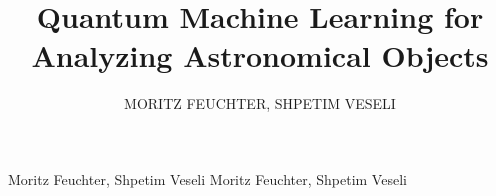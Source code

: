 
\title{Quantum Machine Learning for Analyzing Astronomical Objects}
\author{\uppercase{Moritz Feuchter}, \uppercase{Shpetim Veseli}}
\address[1]{Zurich University of Applied Sciences, School of Engineering (e-mail: feuchmor@students.zhaw.ch)}
\address[2]{Zurich University of Applied Sciences, School of Engineering (e-mail: veselshp@students.zhaw.ch)}

\markboth
{Moritz Feuchter, Shpetim Veseli \headeretal}
{Moritz Feuchter, Shpetim Veseli \headeretal}

